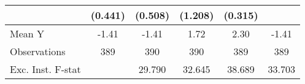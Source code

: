 {\begin{tabular}{l*{5}{c}}
            &     (0.441)         &     (0.508)         &     (1.208)         &     (0.315)         &                     \\
\midrule
Mean Y      &       -1.41         &       -1.41         &        1.72         &        2.30         &       -1.41         \\
Observations&         389         &         390         &         390         &         389         &         389         \\
Exc. Inst. F-stat&                     &      29.790         &      32.645         &      38.689         &      33.703         \\
\bottomrule
\end{tabular}
}
